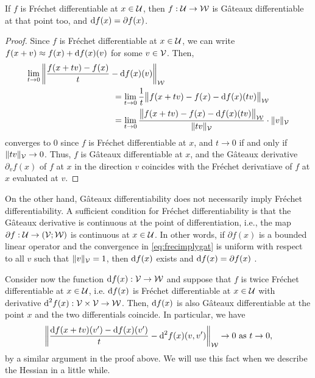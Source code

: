 \begin{lemma}
  If $f$ is Fréchet differentiable at $x\in{\mathcal U}$, then $f:{\mathcal U}\to{\mathcal W}$ is Gâteaux differentiable at that point too, and $\text{d} f(x) = \partial f(x)$.
\end{lemma}

\begin{proof}
  Since $f$ is Fréchet differentiable at $x\in{\mathcal U}$, we can write $f(x+v) \approx f(x) + \text{d} f(x)(v)$ for some $v\in{\mathcal V}$.
  Then, 
  \begin{align}\label{eq:frecimplygat}
    \lim_{t\to 0}  & \left\Vert \frac{f(x + t v) - f(x)}{t} - \d f(x)(v) \right\Vert_\cW \\
    &\hspace{3cm}= \lim_{t\to 0} \frac{1}{t} \big\Vert f(x + t v) - f(x) - \d f(x)(tv)  \big\Vert_\cW \nonumber \\
    &\hspace{3cm}= \lim_{t\to 0} \frac{\big\Vert f(x + t v) - f(x) - \d f(x)(tv) \big\Vert_\cW }{\norm{tv}_\cV}\cdot \norm{v}_\cV  \nonumber
  \end{align}
  converges to 0 since $f$ is Fréchet differentiable at $x$, and  $t\to 0$ if and only if $\lVert tv\rVert_{\mathcal V} \to 0$.
  Thus, $f$ is Gâteaux differentiable at $x$, and the Gâteaux derivative $\partial_v f(x)$ of $f$ at $x$ in the direction $v$ coincides with the Fréchet derivatiave of $f$ at $x$ evaluated at $v$.
\end{proof}

On the other hand, Gâteaux differentiability does not necessarily imply Fréchet differentiability.
A sufficient condition for Fréchet differentiability is  that the Gâteaux derivative is continuous at the point of differentiation, i.e., the map $\partial f: {\mathcal U} \to ({\mathcal V};{\mathcal W})$ is continuous at $x\in{\mathcal U}$.
In other words, if $\partial f(x)$ is a bounded linear operator and the convergence in \cref{eq:frecimplygat} is uniform with respect to all $v$ such that $\lVert v\rVert_{\mathcal V}=1$, then $\text{d} f(x)$ exists and $\text{d} f(x) = \partial f(x)$ \citep[p. 57 \& 66]{tapia1971diff}.

Consider now the function $\text{d} f(x):{\mathcal V}\to{\mathcal W}$ and suppose that $f$ is twice Fréchet differentiable at $x\in{\mathcal U}$, i.e. $\text{d} f(x)$ is Fréchet differentiable at $x\in{\mathcal U}$ with derivative $\text{d}^2 f(x):{\mathcal V}\times{\mathcal V} \to {\mathcal W}$.
Then, $\text{d} f(x)$ is also Gâteaux differentiable at the point $x$ and the two differentials coincide.
In particular, we have
\begin{align}\label{eq:frech2gat}
  \left\Vert \frac{\text{d} f(x + t v)(v') - \text{d} f(x)(v')}{t} - \text{d}^2 f(x)(v,v') \right\Vert_{\mathcal W} \to 0 \text{ as } t \to 0,
\end{align}
by a similar argument in the proof above.
We will use this fact when we describe the Hessian in a little while.

